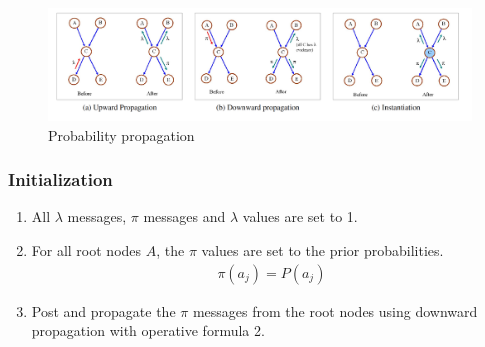 \documentclass[12pt,twoside]{article}
\begin{document}
\begin{figure}[H]
\begin{center}
\includegraphics[width = 1.00\hsize]{./figures/ProbabilityPropagation.png} %
\caption{Probability propagation} %
\label{fig:NaiveBayes} %
\end{center}
\end{figure}

\subsubsection{Initialization}
\begin{enumerate}
	\item All $\lambda$ messages, $\pi$ messages and $\lambda$ values are set to 1.
	\item For all root nodes $A$, the $\pi$ values are set to the prior probabilities.
		\begin{align*}
			\pi(a_j) = P(a_j)
		\end{align*}
	\item Post and propagate the $\pi$ messages from the root nodes using downward propagation with operative formula 2.
\end{enumerate}
\end{document}
